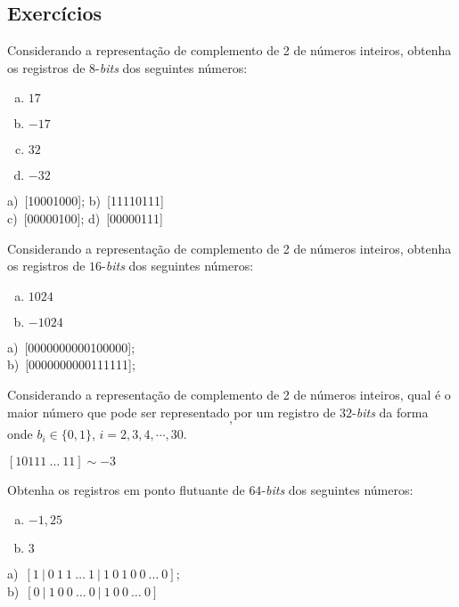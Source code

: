\subsection{Exercícios}

\begin{exer}
  Considerando a representação de complemento de 2 de números inteiros, obtenha os registros de $8$-{\it bits} dos seguintes números:
  \begin{enumerate}[a)]
  \item $17$
  \item $-17$
  \item $32$
  \item $-32$
  \end{enumerate}
\end{exer}
\begin{resp}
  a)~[10001000]; b)~[11110111]\\
  c)~[00000100]; d)~[00000111]
\end{resp}

\begin{exer}
  Considerando a representação de complemento de 2 de números inteiros, obtenha os registros de $16$-{\it bits} dos seguintes números:
  \begin{enumerate}[a)]
  \item $1024$
  \item $-1024$
  \end{enumerate}
\end{exer}
\begin{resp}
    a)~[0000000000100000]; \\
    b)~[0000000000111111];
\end{resp}

\begin{exer}
  Considerando a representação de complemento de 2 de números inteiros, qual é o maior número que pode ser representado por um registro de $32$-{\it bits} da forma
  \begin{equation}
    [1 ~ 0 ~ b_2 ~ b_3 ~ b_4 ~ \cdots ~ b_{30} ~ 1],
  \end{equation}
onde $b_i \in \{0, 1\}$, $i=2, 3, 4, \cdots, 30$.
\end{exer}
\begin{resp}
  $[10111~\ldots~11] \sim -3$
\end{resp}

\begin{exer}
  Obtenha os registros em ponto flutuante de $64$-{\it bits} dos seguintes números:
  \begin{enumerate}[a)]
  \item $-1,25$
  \item $3$
  \end{enumerate}
\end{exer}
\begin{resp}
    a)~$[1 ~ | ~ 0 ~ 1 ~ 1 ~ \ldots ~ 1 ~ | ~ 1 ~ 0 ~ 1 ~ 0 ~ 0 ~ \ldots ~ 0]$;\\
    b)~$[0 ~ | ~ 1 ~ 0 ~ 0 ~ \ldots ~ 0 ~ | ~ 1 ~ 0 ~ 0 ~ \ldots ~ 0]$
\end{resp}

